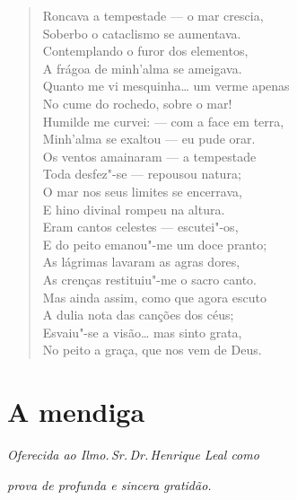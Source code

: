 \begin{verse}
Roncava a tempestade --- o mar crescia,\\
Soberbo o cataclismo se aumentava.\\
Contemplando o furor dos elementos,\\
A frágoa de minh'alma se ameigava.\\
Quanto me vi mesquinha\ldots{} um verme apenas\\
No cume do rochedo, sobre o mar!\\
Humilde me curvei: --- com a face em terra,\\
Minh'alma se exaltou --- eu pude orar.\\
Os ventos amainaram --- a tempestade\\
Toda desfez"-se --- repousou natura;\\
O mar nos seus limites se encerrava,\\
E hino divinal rompeu na altura.\\
Eram cantos celestes --- escutei"-os,\\
E do peito emanou"-me um doce pranto;\\
As lágrimas lavaram as agras dores,\\
As crenças restituiu"-me o sacro canto.\\
Mas ainda assim, como que agora escuto\\
A dulia nota das canções dos céus;\\
Esvaiu"-se a visão\ldots{} mas sinto grata,\\
No peito a graça, que nos vem de Deus.
\end{verse}

\chapter{A mendiga}

\hfill{}\emph{Oferecida ao Ilmo.\,Sr.\,Dr.\,Henrique Leal como}

\hfill{}\emph{prova de profunda e sincera gratidão.}

